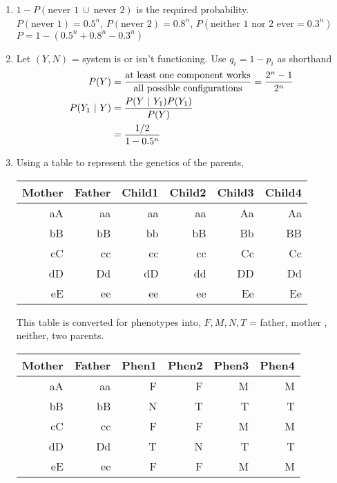 \begin{enumerate}
	\item $ 1 - P( \text{never 1}\  \cup\  \text{never 2}) $ is the required probability. \\
	$ P(\text{never 1}) = 0.5^n $, $ P(\text{never 2}) = 0.8^n $, $P(\text{neither 1 nor 2 ever} = 0.3^n)$ \\
	$ P = 1 - (0.5^n + 0.8^n - 0.3^n) $\\
	
	\item Let $ (Y, N) $ = system is or isn't functioning.  Use $ q_i = 1 - p_i $ as shorthand\\
	\begin{subequations}
		\begin{align}
			P(Y) &= \frac{\text{at least one component works}}{\text{all possible configurations}} = \frac{2^n - 1}{2^n} \\
			P(Y_1\ |\ Y) &= \frac{P(Y\ |\ Y_1) P(Y_1)}{P(Y)} \\
			&= \frac{1/2}{1 - 0.5^n}
		\end{align} \\
	\end{subequations}
	
	\item 	Using a table to represent the genetics of the parents, 
	\begin{table}[H]
		\centering
		\begin{tabular}{@{}rr|rrrr@{}}
			\toprule
			Mother & Father & Child1 & Child2 & Child3 & Child4 \\ \midrule
			aA     & aa		& aa	 & aa 	  & Aa 	   & Aa   \\
			bB     & bB     & bb	 & bB 	  & Bb 	   & BB    \\
			cC     & cc     & cc	 & cc 	  & Cc 	   & Cc    \\
			dD     & Dd     & dD	 & dd 	  & DD 	   & Dd    \\
			eE     & ee     & ee	 & ee 	  & Ee 	   & Ee    \\ \bottomrule
		\end{tabular}
	\end{table}
	
	This table is converted for phenotypes into, $ F, M, N, T $ = father, mother , neither, two parents.\\
	
	\begin{table}[H]
		\centering
		\begin{tabular}{@{}rr|rrrr@{}}
			\toprule
			Mother & Father & Phen1 & Phen2 & Phen3 & Phen4 \\ \midrule
			aA     & aa		& F	 & F 	  & M 	   & M   \\
			bB     & bB     & N	 & T 	  & T 	   & T    \\
			cC     & cc     & F	 & F 	  & M 	   & M    \\
			dD     & Dd     & T	 & N 	  & T 	   & T    \\
			eE     & ee     & F	 & F 	  & M 	   & M    \\ \bottomrule
		\end{tabular}
	\end{table}
	

\end{enumerate}
